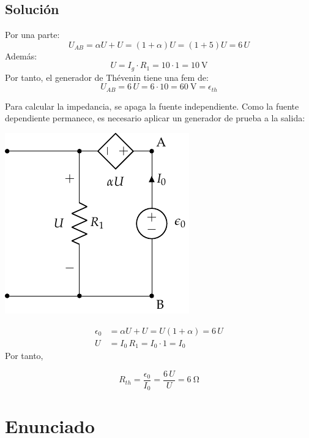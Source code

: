 \subsection*{Solución}
Por una parte:
\begin{equation*}
  U_{AB} = \alpha U + U = (1 + \alpha) U=(1+5)U=6\,U
\end{equation*}
Además:
\begin{equation*}
  U = I_g \cdot R_1=10\cdot 1 = \qty{10}{\volt}
\end{equation*}
Por tanto, el generador de Thévenin tiene una fem de:
\begin{equation*}
  U_{AB} = 6\, U= 6\cdot 10=\qty{60}{\volt} = \epsilon_{th}
\end{equation*}

Para calcular la impedancia, se apaga la fuente independiente. Como la
fuente dependiente permanece, es necesario aplicar un generador de
prueba a la salida:

\begin{center}
  \includegraphics{figuras/Thevenin1_fuenteprueba.pdf}
\end{center}

\begin{align*}
  \epsilon_0 &= \alpha U + U = U(1+\alpha)=6\,U\\
  U &= I_0\,R_1=I_0\cdot 1=I_0
\end{align*}
Por tanto,

\begin{equation*}
  R_{th} = \dfrac{\epsilon_0}{I_0}=\dfrac{6\,U}{U} = \qty{6}{\ohm}
\end{equation*}


\section{Enunciado}

